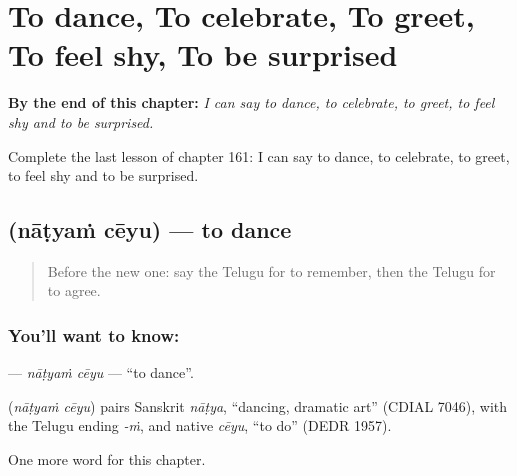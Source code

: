 
\chapter{To dance, To celebrate, To greet, To feel shy, To be surprised}
\label{ch:te-to-dance-to-celebrate-to-greet-to-feel-shy-to-be-surprised}

\begin{chapteropening}
\textbf{By the end of this chapter:} \emph{I can say to dance, to celebrate, to greet, to feel shy and to be surprised.}

Complete the last lesson of chapter 161: I can say to dance, to celebrate, to greet, to feel shy and to be surprised.
\end{chapteropening}

\section[\texorpdfstring{\te{నాట్యం} \te{చేయు} (nāṭyaṁ cēyu)}{నాట్యం చేయు (nāṭyaṁ cēyu)}]{  (nāṭyaṁ cēyu) — to dance}

\label{lesson:TE-C161-natyam-ceyu}



\begin{quote}
Before the new one: say the Telugu for to remember, then the Telugu for to agree.
\end{quote}

\subsection*{You'll want to know:  }
\textbf{ } — \emph{nāṭyaṁ cēyu} — \textquotedblleft{}to dance\textquotedblright{}.

\begin{cousinweb}
\textbf{ } (\emph{nāṭyaṁ cēyu}) pairs Sanskrit \emph{nāṭya}, \textquotedblleft{}dancing, dramatic art\textquotedblright{} (CDIAL 7046), with the Telugu ending \emph{-ṁ}, and native \emph{cēyu}, \textquotedblleft{}to do\textquotedblright{} (DEDR 1957).
\end{cousinweb}

\begin{grammarlens}[title={What you've built}]
One more word for this chapter.
\end{grammarlens}

